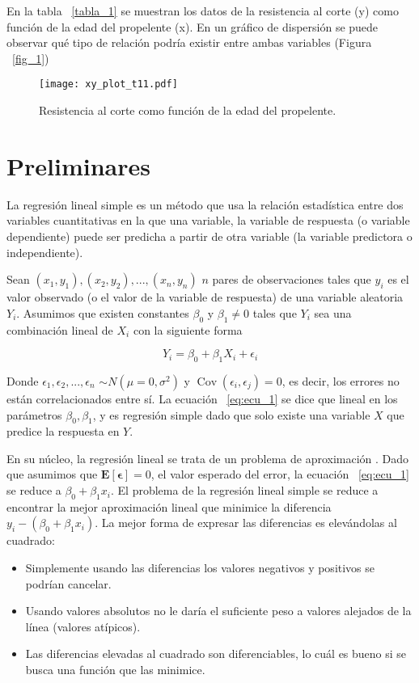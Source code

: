 \documentclass[letterpaper,12pt]{article}
\DeclareMathOperator{\Cov}{\mathrm{Cov}}
\begin{document}
En la tabla ~\ref{tabla_1} se muestran los datos de la resistencia al corte (y) como función de la edad del propelente (x). En un gráfico de dispersión se puede observar qué tipo de relación podría existir entre ambas variables (Figura ~\ref{fig_1})

\begin{figure}[H]
	\centering
	\texttt{[image: xy\_plot\_t11.pdf]}
	\caption{Resistencia al corte como función de la edad del propelente.}
	\label{fig:fig_1}
\end{figure}

\section*{Preliminares}

La regresión lineal simple es un método que usa la relación estadística entre dos variables cuantitativas en la que una variable, la variable de respuesta (o variable dependiente) puede ser predicha a partir de otra variable (la variable predictora o independiente). 

Sean $(x_1,y_1),(x_2,y_2),...,(x_n,y_n)$ $n$ pares de observaciones tales que $y_i$ es el valor observado (o el valor de la variable de respuesta) de una variable aleatoria $Y_i$. Asumimos que existen constantes $\beta_0$ y $\beta_1 \neq 0$ tales que $Y_i$ sea una combinación lineal de $X_i$ con la siguiente forma

\begin{equation}
Y_i = \beta_0 + \beta_1X_i + \epsilon_i
\label{eq:ecu_1}
\end{equation}


Donde $\epsilon_1,\epsilon_2,...,\epsilon_n$ $\sim N(\mu = 0,\sigma^2)$ y $\Cov(\epsilon_i,\epsilon_j) = 0$, es decir, los errores no están correlacionados entre sí. La ecuación ~\ref{eq:ecu_1} se dice que lineal en los parámetros $\beta_0,\beta_1$, y es regresión simple dado que solo existe una variable $X$ que predice la respuesta en $Y$.

En su núcleo, la regresión lineal se trata de un problema de aproximación \citep[cáp. 8]{burden2015}. Dado que asumimos que $\mathbf{E[\epsilon]} = 0$, el valor esperado del error, la ecuación ~\ref{eq:ecu_1} se reduce a $\beta_0 + \beta_1 x_i$. El problema de la regresión lineal simple se reduce a encontrar la mejor aproximación lineal que minimice la diferencia $y_i - (\beta_0 + \beta_1 x_i)$. La mejor forma de expresar las diferencias es elevándolas al cuadrado:

\begin{itemize}
	\item Simplemente usando las diferencias los valores negativos y positivos se podrían cancelar.
	\item Usando valores absolutos no le daría el suficiente peso a valores alejados de la línea (valores atípicos).
	\item Las diferencias elevadas al cuadrado son diferenciables, lo cuál es bueno si se busca una función que las minimice. 
\end{itemize}
\end{document}
